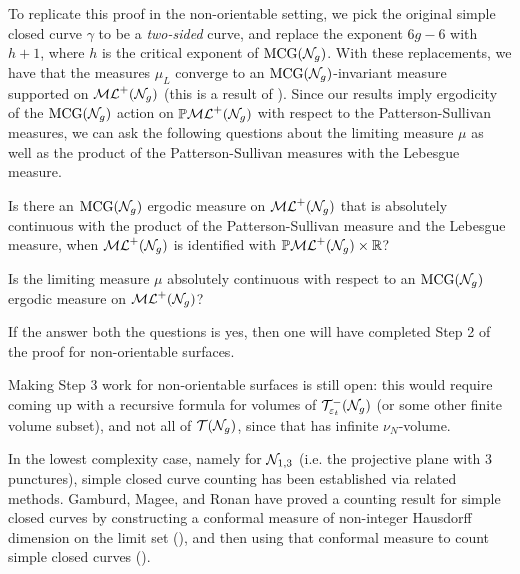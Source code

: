 To replicate this proof in the non-orientable setting, we pick the original simple closed curve $\gamma$ to be a \emph{two-sided} curve, and replace the exponent $6g-6$ with $h + 1$, where $h$ is the critical exponent of $\mathrm{MCG}(\mathcal{N}_g)$.
With these replacements, we have that the measures $\mu_L$ converge to an $\mathrm{MCG}(\mathcal{N}_g)$-invariant measure supported on $\mathcal{ML}^+(\mathcal{N}_g)$ (this is a result of \textcite{erlandsson2023mapping}).
Since our results imply ergodicity of the $\mathrm{MCG}(\mathcal{N}_g)$ action on $\mathbb{P}\mathcal{ML}^+(\mathcal{N}_g)$ with respect to the Patterson-Sullivan measures, we can ask the following questions about the limiting measure $\mu$ as well as the product of the Patterson-Sullivan measures with the Lebesgue measure.
\begin{question}
  Is there an $\mathrm{MCG}(\mathcal{N}_g)$ ergodic measure on $\mathcal{ML}^+(\mathcal{N}_g)$ that is absolutely continuous with the product of the Patterson-Sullivan measure and the Lebesgue measure, when $\mathcal{ML}^+(\mathcal{N}_g)$ is identified with $\mathbb{P}\mathcal{ML}^+(\mathcal{N}_g) \times \mathbb{R}$?
\end{question}

\begin{question}
  Is the limiting measure $\mu$ absolutely continuous with respect to an $\mathrm{MCG}(\mathcal{N}_g)$ ergodic measure on $\mathcal{ML}^+(\mathcal{N}_g)$?
\end{question}
If the answer both the questions is yes, then one will have completed Step 2 of the proof for non-orientable surfaces.

Making Step 3 work for non-orientable surfaces is still open: this would require coming up with a recursive formula for volumes of $\mathcal{T}_{\varepsilon_t}^{-}(\mathcal{N}_g)$ (or some other finite volume subset), and not all of $\mathcal{T}(\mathcal{N}_g)$, since that has infinite $\nu_N$-volume.

In the lowest complexity case, namely for $\mathcal{N}_{1,3}$ (i.e. the projective plane with $3$ punctures), simple closed curve counting has been established via related methods.
Gamburd, Magee, and Ronan have proved a counting result for simple closed curves by constructing a conformal measure of non-integer Hausdorff dimension on the limit set (\cite[Theorem 10]{10.4007/annals.2019.190.3.2}), and then using that conformal measure to count simple closed curves (\cite[Theorem 2]{10.1093/imrn/rny112}).

